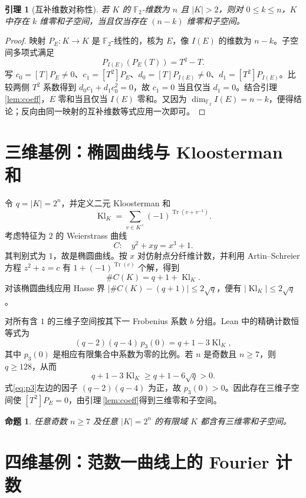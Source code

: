 \documentclass[UTF8,a4paper,11pt]{ctexart}
\numberwithin{equation}{section}
\newtheorem{lemma}[theorem]{引理}
\newtheorem{proposition}[theorem]{命题}
\theoremstyle{definition}
\theoremstyle{remark}
\newcommand{\Ftwo}{\mathbb F_2}
\newcommand{\tr}{\operatorname{Tr}}
\newcommand{\dimf}{\dim_{\Ftwo}}
\begin{document}
\begin{lemma}[互补维数对称性]\label{lem:complement}
若 $K$ 的 $\Ftwo$-维数为 $n$ 且 $|K|>2$，则对 $0\le k\le n$，$K$ 中存在 $k$ 维零和子空间，当且仅当存在 $(n-k)$ 维零和子空间。
\end{lemma}
\begin{proof}
映射 $P_E:K\to K$ 是 $\Ftwo$-线性的，核为 $E$，像 $I(E)$ 的维数为 $n-k$。子空间多项式满足
\[
 P_{I(E)}(P_E(T))=T^q-T.
\]
写 $c_0=[T]P_E\ne0$、$c_1=[T^2]P_E$、$d_0=[T]P_{I(E)}\ne0$、$d_1=[T^2]P_{I(E)}$。比较两侧 $T^2$ 系数得到 $d_0c_1+d_1c_0^2=0$，故 $c_1=0$ 当且仅当 $d_1=0$。结合引理\,\ref{lem:coeff}，$E$ 零和当且仅当 $I(E)$ 零和。又因为 $\dimf I(E)=n-k$，便得结论；反向由同一映射的互补维数等式应用一次即可。
\end{proof}

\section{三维基例：椭圆曲线与 Kloosterman 和}

令 $q=|K|=2^n$，并定义二元 Kloosterman 和
\[
 \operatorname{Kl}_K=\sum_{v\in K^\times}(-1)^{\tr(v+v^{-1})}.
\]
考虑特征为 $2$ 的 Weierstrass 曲线
\[
 C:\quad y^2+xy=x^3+1.
\]
其判别式为 $1$，故是椭圆曲线。按 $x$ 对仿射点分纤维计数，并利用 Artin--Schreier 方程 $z^2+z=c$ 有 $1+(-1)^{\tr(c)}$ 个解，得到
\[
 \#C(K)=q+1+\operatorname{Kl}_K.
\]
对该椭圆曲线应用 Hasse 界\cite{Silverman} $|\#C(K)-(q+1)|\le2\sqrt q$，便有 $|\operatorname{Kl}_K|\le2\sqrt q$。

对所有含 $1$ 的三维子空间按其下一 Frobenius 系数 $b$ 分组。Lean 中的精确计数恒等式为
\begin{equation}\label{eq:p3}
 (q-2)(q-4)\,p_3(0)=q+1-3\operatorname{Kl}_K,
\end{equation}
其中 $p_3(0)$ 是相应有限集合中系数为零的比例。若 $n$ 是奇数且 $n\ge7$，则 $q\ge128$，从而
\[
 q+1-3\operatorname{Kl}_K\ge q+1-6\sqrt q>0.
\]
式\eqref{eq:p3}左边的因子 $(q-2)(q-4)$ 为正，故 $p_3(0)>0$。因此存在三维子空间使 $[T^2]P_E=0$，由引理\,\ref{lem:coeff}得到三维零和子空间。

\begin{proposition}\label{prop:k3}
任意奇数 $n\ge7$ 及任意 $|K|=2^n$ 的有限域 $K$ 都含有三维零和子空间。
\end{proposition}

\section{四维基例：范数一曲线上的 Fourier 计数}
\end{document}
